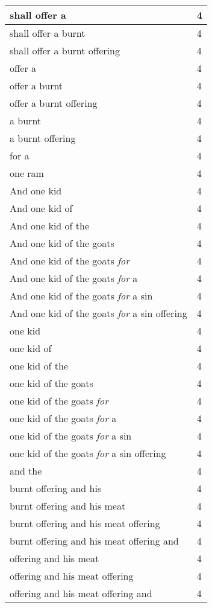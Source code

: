 \begin{center}
\begin{longtable}{|p{3.0in}|p{0.5in}|}
shall offer a & 4\\ \hline 
shall offer a burnt & 4\\ \hline 
shall offer a burnt offering & 4\\ \hline 
offer a & 4\\ \hline 
offer a burnt & 4\\ \hline 
offer a burnt offering & 4\\ \hline 
a burnt & 4\\ \hline 
a burnt offering & 4\\ \hline 
for a & 4\\ \hline 
one ram & 4\\ \hline 
And one kid & 4\\ \hline 
And one kid of & 4\\ \hline 
And one kid of the & 4\\ \hline 
And one kid of the goats & 4\\ \hline 
And one kid of the goats \emph{for} & 4\\ \hline 
And one kid of the goats \emph{for} a & 4\\ \hline 
And one kid of the goats \emph{for} a sin & 4\\ \hline 
And one kid of the goats \emph{for} a sin offering & 4\\ \hline 
one kid & 4\\ \hline 
one kid of & 4\\ \hline 
one kid of the & 4\\ \hline 
one kid of the goats & 4\\ \hline 
one kid of the goats \emph{for} & 4\\ \hline 
one kid of the goats \emph{for} a & 4\\ \hline 
one kid of the goats \emph{for} a sin & 4\\ \hline 
one kid of the goats \emph{for} a sin offering & 4\\ \hline 
and the & 4\\ \hline 
burnt offering and his & 4\\ \hline 
burnt offering and his meat & 4\\ \hline 
burnt offering and his meat offering & 4\\ \hline 
burnt offering and his meat offering and & 4\\ \hline 
offering and his meat & 4\\ \hline 
offering and his meat offering & 4\\ \hline 
offering and his meat offering and & 4\\ \hline 

\end{longtable}
\end{center}
